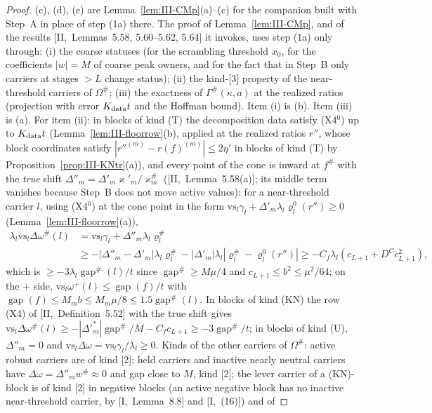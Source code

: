 \documentclass[10pt]{amsart}
\theoremstyle{definition}
\theoremstyle{remark}
\newcommand{\gap}{\operatorname{gap}}
\begin{document}
\begin{proof}
(c), (d), (e) are Lemma~\ref{lem:III-CMp}(a)--(c) for the companion built with
Step~A in place of step (1a) there.  The proof of Lemma~\ref{lem:III-CMp}, and of
the results [II,~Lemmas~5.58, 5.60--5.62, 5.64] it invokes, uses step (1a) only
through: (i) the coarse statuses
(for the scrambling threshold $x_0$, for the coefficients $|w|=M$ of coarse
peak owners, and for the fact that in Step~B only carriers at stages $>L$
change status); (ii) the kind-[3] property of the near-threshold carriers of
$\Omega^\#$; (iii) the exactness of $\Gamma^\#(\kappa,a)$ at the realized ratios
(projection with error $K_{\rm data}t$ and the Hoffman bound).  Item (i) is
(b).  Item (iii) is (a).  For item (ii): in blocks of kind (T) the
decomposition data satisfy (X4$^0$) up to $K_{\rm data}t$
(Lemma~\ref{lem:III-floorrow}(b), applied at the realized ratios $r''$, whose
block coordinates satisfy $|r''^{(m)}-r(f)^{(m)}|\le2\eta'$ in blocks of kind
(T) by Proposition~\ref{prop:III-KNtr}(a)), and every point of the cone is inward at
$f^\#$ with the \emph{true} shift $\Delta''_m=\Delta'_m\varkappa'_m/\varkappa^\#_m$
([II,~Lemma~5.58(a)]; its middle term vanishes because Step~B does not move
active values): for a near-threshold carrier $l$, using (X4$^0$) at the cone
point in the form $\mathrm{vs}_l\gamma_l+\Delta'_m\lambda_l\varrho^0_l(r'')\ge0$
(Lemma~\ref{lem:III-floorrow}(a)),
\begin{align*}
 \lambda_l\mathrm{vs}_l\Delta\omega^\#(l)&=\mathrm{vs}_l\gamma_l+\Delta''_m\lambda_l
 \varrho^\#_l\\
 &\ge-|\Delta''_m-\Delta'_m|\lambda_l\varrho^\#_l-|\Delta'_m|\lambda_l
 |\varrho^\#_l-\varrho^0_l(r'')|\ge-C_f\lambda_l(c_{L+1}+D^Cc_{L+1}^2),
\end{align*}
which is $\ge-3\lambda_l\gap^\#(l)/t$ since $\gap^\#\ge M\mu/4$ and $c_{L+1}\le
b^2\le\mu^2/64$; on the $+$ side, $\mathrm{vs}_l\omega^+(l)\le\gap(f)/t$ with
$\gap(f)\le M_mb\le M_m\mu/8\le1.5\gap^\#(l)$.  In blocks of kind (KN) the row
(X4) of [II,~Definition~5.52] with the true shift gives $\mathrm{vs}_l
\Delta\omega^\#(l)\ge-|\Delta'^*_m|\gap^\#/M-C_fc_{L+1}\ge-3\gap^\#/t$; in blocks of
kind (U), $\Delta''_m=0$ and $\mathrm{vs}_l\Delta\omega=\mathrm{vs}_l\gamma_l/\lambda_l\ge0$.
Kinds of the other carriers of $\Omega^\#$: active robust carriers are of kind
[2]; held carriers and inactive nearly neutral carriers have $\Delta\omega=
\Delta''_mw^\#\approx0$ and gap close to $M$, kind [2]; the lever carrier of a
(KN)-block is of kind [2] in negative blocks (an active negative block has no
inactive near-threshold carrier, by [I,~Lemma~8.8] and [I,~(16)]) and of

\end{proof}
\end{document}
